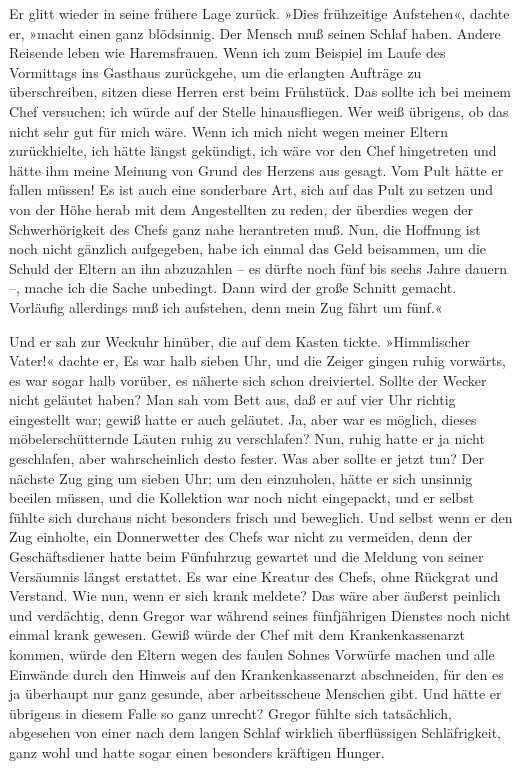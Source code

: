 Er glitt wieder in seine frühere Lage zurück. »Dies frühzeitige
Aufstehen«, dachte er, »macht einen ganz blödsinnig. Der Mensch muß
seinen Schlaf haben. Andere Reisende leben wie Haremsfrauen. Wenn ich
zum Beispiel im Laufe des Vormittags ins Gasthaus zurückgehe, um die
erlangten Aufträge zu überschreiben, sitzen diese Herren erst beim
Frühstück. Das sollte ich bei meinem Chef versuchen; ich würde auf der
Stelle hinausfliegen. Wer weiß übrigens, ob das nicht sehr gut für mich
wäre. Wenn ich mich nicht wegen meiner Eltern zurückhielte, ich hätte
längst gekündigt, ich wäre vor den Chef hingetreten und hätte ihm meine
Meinung von Grund des Herzens aus gesagt. Vom Pult hätte er fallen
müssen! Es ist auch eine sonderbare Art, sich auf das Pult zu setzen und
von der Höhe herab mit dem Angestellten zu reden, der überdies wegen der
Schwerhörigkeit des Chefs ganz nahe herantreten muß. Nun, die Hoffnung
ist noch nicht gänzlich aufgegeben, habe ich einmal das Geld beisammen,
um die Schuld der Eltern an ihn abzuzahlen -- es dürfte noch fünf bis
sechs Jahre dauern --, mache ich die Sache unbedingt. Dann wird der
große Schnitt gemacht. Vorläufig allerdings muß ich aufstehen, denn mein
Zug fährt um fünf.«

Und er sah zur Weckuhr hinüber, die auf dem Kasten tickte. »Himmlischer
Vater!« dachte er, Es war halb sieben Uhr, und die Zeiger gingen ruhig
vorwärts, es war sogar halb vorüber, es näherte sich schon dreiviertel.
Sollte der Wecker nicht geläutet haben? Man sah vom Bett aus, daß er auf
vier Uhr richtig eingestellt war; gewiß hatte er auch geläutet. Ja, aber
war es möglich, dieses möbelerschütternde Läuten ruhig zu verschlafen?
Nun, ruhig hatte er ja nicht geschlafen, aber wahrscheinlich desto
fester. Was aber sollte er jetzt tun? Der nächste Zug ging um sieben
Uhr; um den einzuholen, hätte er sich unsinnig beeilen müssen, und die
Kollektion war noch nicht eingepackt, und er selbst fühlte sich durchaus
nicht besonders frisch und beweglich. Und selbst wenn er den Zug
einholte, ein Donnerwetter des Chefs war nicht zu vermeiden, denn der
Geschäftsdiener hatte beim Fünfuhrzug gewartet und die Meldung von
seiner Versäumnis längst erstattet. Es war eine Kreatur des Chefs, ohne
Rückgrat und Verstand. Wie nun, wenn er sich krank meldete? Das wäre
aber äußerst peinlich und verdächtig, denn Gregor war während seines
fünfjährigen Dienstes noch nicht einmal krank gewesen. Gewiß würde der
Chef mit dem Krankenkassenarzt kommen, würde den Eltern wegen des faulen
Sohnes Vorwürfe machen und alle Einwände durch den Hinweis auf den
Krankenkassenarzt abschneiden, für den es ja überhaupt nur ganz gesunde,
aber arbeitsscheue Menschen gibt. Und hätte er übrigens in diesem Falle
so ganz unrecht? Gregor fühlte sich tatsächlich, abgesehen von einer
nach dem langen Schlaf wirklich überflüssigen Schläfrigkeit, ganz wohl
und hatte sogar einen besonders kräftigen Hunger.

